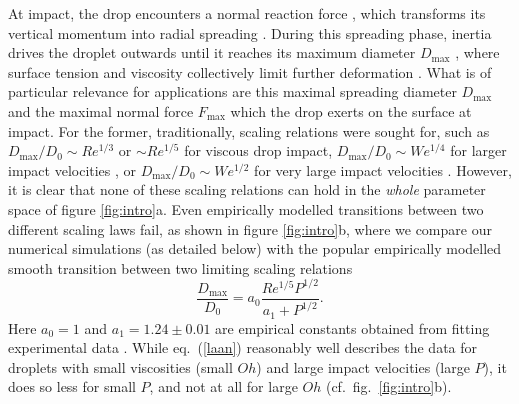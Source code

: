 \documentclass[preprint,amssymb,superscriptaddress,aps,prl,floatfix]{revtex4-1}
\newcommand{\bb}{\color{black} \normalfont}
\begin{document}
At impact, the drop
encounters a normal reaction force \cite{Nearing1986,Mitchell2019,cheng2021drop}, which transforms its vertical momentum into radial spreading \cite{sanjayzhang2022prl}. During this spreading  phase, inertia drives the droplet outwards  until it reaches its  maximum diameter $D_\text{max} $ \cite{chandra1991collision}, where surface tension and viscosity collectively limit further deformation \cite{sanjay2024inertia}.
What is of particular relevance for applications 
are
this maximal  spreading diameter $D_\text{max}$ and the 
maximal normal force $F_\text{max}$ 
which the drop
exerts on the surface at impact. 
For the former,  traditionally,
scaling relations were sought for, such as
$D_\text{max} /D_0 \sim Re^{1/3}$ \cite{jorgensen2024deformation} or $\sim Re^{1/5}$ \cite{madejski1976solidification,fedorchenko2005effect} for viscous drop impact, $D_\text{max} /D_0 \sim We^{1/4}$ \bb for larger impact velocities 
\cite{Clanet2004}, 
or $D_\text{max} /D_0 \sim We^{1/2}$ for very large impact velocities 
\cite{bennett1993splat,Eggers2010,villermaux2011drop,Wildeman2016}. 
However, it is clear that none of these scaling relations can hold in 
the {\it  whole}  parameter space of figure \ref{fig:intro}a. Even empirically modelled  
transitions between two different 
scaling laws fail, as shown in figure 
\ref{fig:intro}b, where we compare our numerical simulations (as detailed below) with
the popular empirically  modelled smooth transition 
between two limiting scaling relations \cite{laan2014maximum}
\begin{equation}
    \frac{D_{\text{max}}}{D_0} = a_0 \frac{Re^{1/5 } P^{1/2}}{a_1 + P^{1/2}}.
    \label{laan}
\end{equation}
Here $a_0 = 1$ and $a_1 = 1.24 \pm 0.01$ are empirical constants obtained from fitting 
experimental data \cite{laan2014maximum}. 
While eq.\ (\ref{laan})  reasonably well describes the data for 
droplets with small viscosities 
(small $Oh$) and large impact velocities
(large $P$), it does so less for small $P$, and not at all for large $Oh$
(cf.\ fig.\ \ref{fig:intro}b). 





\end{document}
